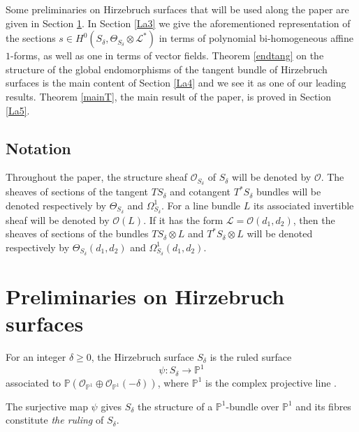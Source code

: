 \documentclass{amsart} %
\theoremstyle{definition}
\newcommand{\cts}{\Theta_{S_{\delta}}}
\newcommand{\cs}{S_{\delta}}
\newcommand{\mcL}{\mathcal{L}}
\newcommand{\mcO}{\mathcal{O}}
\begin{document}
Some preliminaries on Hirzebruch surfaces that will be used along the paper are given in Section \ref{La2}.
In Section \ref{La3}
we give the aforementioned representation of the sections $ s \in H^{0}( S_{\delta}, \cts \otimes \mcL^{*}) $
in terms of polynomial bi-homogeneous affine $1$-forms, as well as one in terms of
vector fields. Theorem \ref{endtang} on the structure of the global endomorphisms of the tangent bundle
of Hirzebruch surfaces is the main content of Section \ref{La4} and we see it as one of our
leading results. Theorem \ref{mainT}, the main result of the paper, is proved in Section \ref{La5}.
\subsection{Notation} Throughout the paper, the structure sheaf $ \mcO_{\cs} $ of $ \cs $ will be denoted by
$ \mcO $. The sheaves of sections of the tangent $ T\cs $ and cotangent $ T^*\cs $ bundles will be denoted
respectively by $ \Theta_{\cs} $ and $ \Omega_{\cs}^1 $. For a line bundle $ L $
its associated invertible sheaf will be denoted by $ \mcO( L ) $. If it has the form
$ \mcL = \mcO(d_1, d_2) $, then the sheaves of sections of the bundles $ T\cs \otimes L $ and
$ T^*\cs \otimes L $ will be denoted respectively by $ \Theta_{\cs}(d_1, d_2) $ and $ \Omega_{\cs}^1(d_1, d_2) $.

\section{Preliminaries on Hirzebruch surfaces}\label{La2}
For an integer $\delta \geq 0 $, the
Hirzebruch surface $S_{\delta}$ is the ruled surface
\begin{equation}\label{ruled}
  \psi: S_{\delta}\rightarrow \mathbb{P}^1
\end{equation}
associated to
$ \mathbb{P}(\mcO_{\mathbb{P}^1}\oplus \mcO_{\mathbb{P}^1}(-\delta)) $, where
$ \mathbb{P}^1 $ is the complex projective line
\cite[Chapter V, Corollary 2.13]{Hartshorne}.

The surjective map $ \psi $
gives $S_{\delta}$ the structure of a $\mathbb{P}^1$-bundle over $\mathbb{P}^1$ and its
fibres constitute \emph{the ruling} of $S_{\delta}$.
\end{document}
